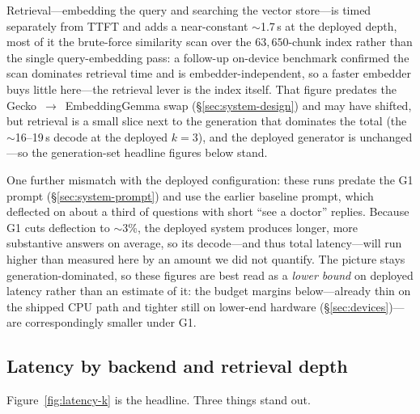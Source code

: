 Retrieval---embedding the query and searching the vector store---is timed
separately from TTFT and adds a near-constant $\sim$1.7\,s at the deployed
depth, most of it the brute-force similarity scan over the $63{,}650$-chunk
index rather than the single query-embedding pass: a follow-up on-device
benchmark confirmed the scan dominates retrieval time and is
embedder-independent, so a faster embedder buys little here---the retrieval
lever is the index itself. That figure predates the
Gecko~$\to$~EmbeddingGemma swap (\S\ref{sec:system-design}) and may have
shifted, but retrieval is a small slice next to the generation that dominates
the total (the $\sim$16--19\,s decode at the deployed $k{=}3$), and the
deployed generator is unchanged---so the generation-set headline figures below
stand.

One further mismatch with the deployed configuration: these runs predate the G1
prompt (\S\ref{sec:system-prompt}) and use the earlier baseline prompt, which
deflected on about a third of questions with short ``see a doctor'' replies.
Because G1 cuts deflection to $\sim$3\%, the deployed system produces longer,
more substantive answers on average, so its decode---and thus total
latency---will run higher than measured here by an amount we did not quantify.
The picture stays generation-dominated, so these figures are best read as a
\emph{lower bound} on deployed latency rather than an estimate of it: the budget
margins below---already thin on the shipped CPU path and tighter still on
lower-end hardware (\S\ref{sec:devices})---are correspondingly smaller
under G1.

\subsection{Latency by backend and retrieval depth}
\label{sec:latency-sweep}

Figure~\ref{fig:latency-k} is the headline. Three things stand out.

